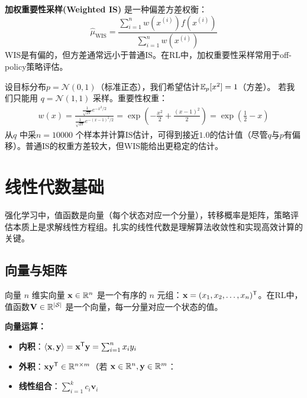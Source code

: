 \textbf{加权重要性采样(Weighted IS)} 是一种偏差方差权衡：
\[
\hat{\mu}_{\mathrm{WIS}} = \frac{\sum_{i=1}^{n} w(x^{(i)}) f(x^{(i)})}{\sum_{i=1}^{n} w(x^{(i)})}
\]
WIS是有偏的，但方差通常远小于普通IS。在RL中，加权重要性采样常用于off-policy策略评估。

\begin{example}
设目标分布$p = \mathcal{N}(0, 1)$（标准正态），我们希望估计$\mathbb{E}_p[x^2] = 1$（方差）。
若我们只能用 $q = \mathcal{N}(1, 1)$ 采样。重要性权重：
\begin{align*}
w(x) = \frac{\frac{1}{\sqrt{2\pi}} e^{-x^2/2}}{\frac{1}{\sqrt{2\pi}} e^{-(x-1)^2/2}} = \exp\left(-\frac{x^2}{2} + \frac{(x-1)^2}{2}\right) = \exp\left(\frac{1}{2} - x\right)
\end{align*}
从$q$ 中采$n=10000$ 个样本并计算IS估计，可得到接近$1.0$的估计值（尽管$q$与$p$有偏移）。普通IS的权重方差较大，但WIS能给出更稳定的估计。
\end{example}

\section{线性代数基础}

强化学习中，值函数是向量（每个状态对应一个分量），转移概率是矩阵，策略评估本质上是求解线性方程组。扎实的线性代数是理解算法收敛性和实现高效计算的关键。

\subsection{向量与矩阵}

\begin{mydefinition}{向量}
$n$ 维实向量 $\mathbf{x} \in \mathbb{R}^n$ 是一个有序的 $n$ 元组：$\mathbf{x} = (x_1, x_2, \dots, x_n)^{\mathsf{T}}$。在RL中，值函数$\mathbf{V} \in \mathbb{R}^{|\mathcal{S}|}$ 是一个向量，每一分量对应一个状态的值。
\end{mydefinition}

\textbf{向量运算：}
\begin{itemize}
    \item \textbf{内积}：$\langle \mathbf{x}, \mathbf{y} \rangle = \mathbf{x}^{\mathsf{T}} \mathbf{y} = \sum_{i=1}^{n} x_i y_i$
    \item \textbf{外积}：$\mathbf{x} \mathbf{y}^{\mathsf{T}} \in \mathbb{R}^{n \times m}$（若 $\mathbf{x} \in \mathbb{R}^n, \mathbf{y} \in \mathbb{R}^m$：
    \item \textbf{线性组合}：$\sum_{i=1}^{k} c_i \mathbf{v}_i$
\end{itemize}

